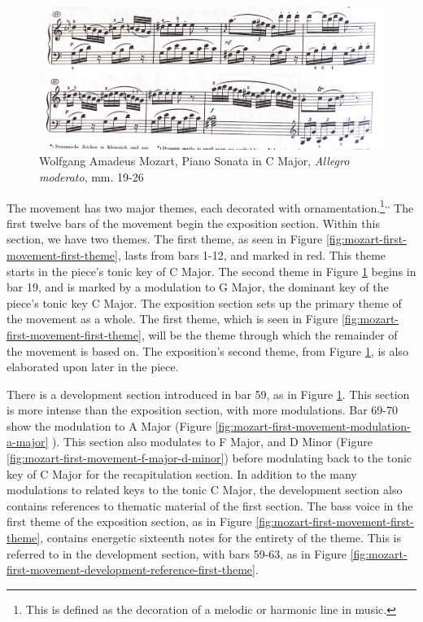 \begin{figure}
    \centering
    \includegraphics[width=\textwidth]{figures/mozart-first-movement-second-theme.jpg}
    \caption{Wolfgang Amadeus Mozart, Piano Sonata in C Major, \textit{Allegro moderato}, mm. 19-26}
    \label{fig:mozart-first-movement-second-theme}
\end{figure}

The movement has two major themes, each decorated with ornamentation.\footnote{This is defined as the decoration of a melodic or harmonic line in music.}\textsuperscript{,}\autocite{Latham_2011a}\textsuperscript{,}\autocite{Burkholder_Grout_Palisca_2014} The first twelve bars of the movement begin the exposition section. Within this section, we have two themes. The first theme, as seen in Figure \ref{fig:mozart-first-movement-first-theme}\autocite{Henle_1977}, lasts from bars 1-12, and marked in red. This theme starts in the piece's tonic key of C Major. The second theme in Figure \ref{fig:mozart-first-movement-second-theme}\autocite{Henle_1977} begins in bar 19, and is marked by a modulation to G Major, the dominant key of the piece's tonic key C Major. The exposition section sets up the primary theme of the movement as a whole. The first theme, which is seen in Figure \ref{fig:mozart-first-movement-first-theme}\autocite{Henle_1977}, will be the theme through which the remainder of the movement is based on. The exposition's second theme, from Figure \ref{fig:mozart-first-movement-second-theme}\autocite{Henle_1977}, is also elaborated upon later in the piece. 

There is a development section introduced in bar 59, as in Figure \ref{fig:mozart-first-movement-second-theme}\autocite{Henle_1977}. This section is more intense than the exposition section, with more modulations. Bar 69-70 show the modulation to A Major (Figure \ref{fig:mozart-first-movement-modulation-a-major} \autocite{Henle_1977}). This section also modulates to F Major, and D Minor (Figure \ref{fig:mozart-first-movement-f-major-d-minor}\autocite{Henle_1977}) before modulating back to the tonic key of C Major for the recapitulation section. In addition to the many modulations to related keys to the tonic C Major, the development section also contains references to thematic material of the first section. The bass voice in the first theme of the exposition section, as in Figure \ref{fig:mozart-first-movement-first-theme}\autocite{Henle_1977}, contains energetic sixteenth notes for the entirety of the theme. This is referred to in the development section, with bars 59-63, as in Figure \ref{fig:mozart-first-movement-development-reference-first-theme}\autocite{Henle_1977}.

